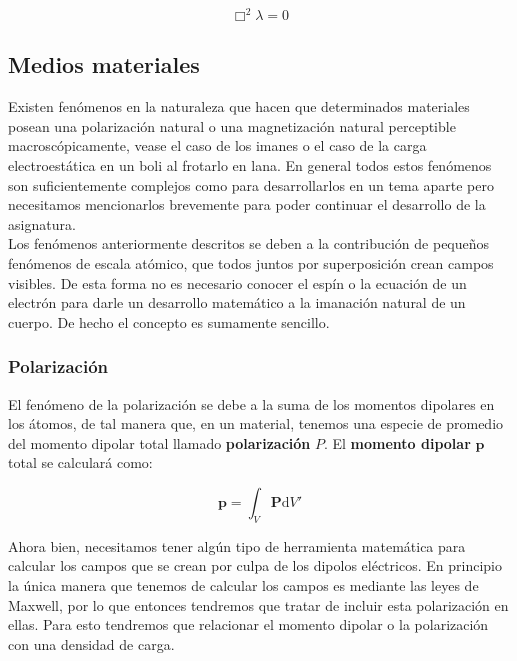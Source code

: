 \documentclass[12pt,a4paper]{article}
\newcommand{\D}{\mathrm{d}}
\newcommand{\Pn}{\mathbf{P}}
\newcommand{\pn}{\mathbf{p}}
\numberwithin{equation}{section}
\numberwithin{figure}{section}
\begin{document}
\begin{equation}
\Box^2 \lambda = 0
\end{equation}


\subsection{Medios materiales}

Existen fenómenos en la naturaleza que hacen que determinados materiales posean una polarización natural o una magnetización natural perceptible macroscópicamente, vease el caso de los imanes o el caso de la carga electroestática en un boli al frotarlo en lana. En general todos estos fenómenos son suficientemente complejos como para desarrollarlos en un tema aparte pero necesitamos mencionarlos brevemente para poder continuar el desarrollo de la asignatura. \\

Los fenómenos anteriormente descritos se deben a la contribución de pequeños fenómenos de escala atómico, que todos juntos por superposición crean campos visibles. De esta forma no es necesario conocer el espín o la ecuación de un electrón para darle un desarrollo matemático a la imanación natural de un cuerpo. De hecho el concepto es sumamente sencillo. \\

\subsubsection{Polarización}
 
El fenómeno de la polarización se debe a la suma de los momentos dipolares en los átomos, de tal manera que, en un material, tenemos una especie de promedio del momento dipolar total llamado \textbf{polarización} $P$. El \textbf{momento dipolar} $\pn$ total se calculará como:

\begin{equation}
\pn = \int_V \Pn \D V'
\end{equation}

Ahora bien, necesitamos tener algún tipo de herramienta matemática para calcular los campos que se crean por culpa de los dipolos eléctricos. En principio la única manera que tenemos de calcular los campos es mediante las leyes de Maxwell, por lo que entonces tendremos que tratar de incluir esta polarización en ellas. Para esto tendremos que relacionar el momento dipolar o la polarización con una densidad de carga. \\
\end{document}
